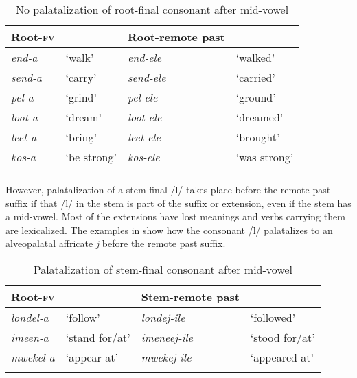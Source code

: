\documentclass[output=paper]{langsci/langscibook}
\begin{document}
\begin{table}
\begin{tabularx}{.75\textwidth}{llXl}
\lsptoprule
Root-\textsc{fv} &  & Root-remote past & \\
\midrule
\textit{end-a} & `walk' & \textit{end-ele} & `walked' \\
\textit{send-a} & `carry' & \textit{send-ele} & `carried' \\
\textit{pel-a} & `grind' & \textit{pel-ele} & `ground' \\
\textit{loot-a} & `dream' & \textit{loot-ele} & `dreamed' \\
\textit{leet-a} & `bring' & \textit{leet-ele} & `brought' \\
\textit{kos-a} & `be strong' & \textit{kos-ele} & `was strong' \\

\lspbottomrule
\end{tabularx}

\caption{No palatalization of root-final consonant after mid-vowel }
\label{tab:16.kawasha}

\end{table}


However, palatalization of a stem final /l/ takes place before the remote past suffix if that /l/ in the stem is part of the suffix or extension, even if the stem has a mid-vowel. Most of the extensions have lost meanings and verbs carrying them are lexicalized. The examples in  show how the consonant /l/ palatalizes to an alveopalatal affricate \textit{j} before the remote past suffix.

\begin{table}
\begin{tabularx}{\textwidth}{XXlX}
\lsptoprule
Root-\textsc{fv} &  & Stem-remote past & \\
\midrule
\textit{londel-a} & `follow' & \textit{londej-ile} & `followed' \\
\textit{imeen-a} & `stand for/at' & \textit{imeneej-ile} & `stood for/at' \\
\textit{mwekel-a} & `appear at' & \textit{mwekej-ile} & `appeared at' \\

\lspbottomrule
\end{tabularx}

\caption{Palatalization of stem-final consonant after mid-vowel}
\label{tab:17.kawasha}

\end{table}
\end{document}

